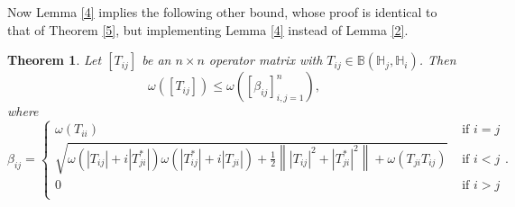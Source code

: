 \documentclass[12pt,twoside,reqno]{amsart}
\newtheorem{theorem}{Theorem}[section]
\numberwithin{equation}{section}
\begin{document}
Now Lemma \ref{4} implies the following other bound, whose proof is identical to that of Theorem \ref{5}, but implementing Lemma \ref{4} instead of Lemma \ref{2}.
\begin{theorem}\label{6}
Let $\left[ {{T}_{ij}} \right]$ be an $n\times n$ operator matrix with ${{T}_{ij}}\in \mathbb B\left( {{\mathbb H}_{j}},{{\mathbb H}_{i}} \right)$. Then
\[\omega \left( \left[ {{T}_{ij}} \right] \right)\le \omega \left( \left[ {{\beta }_{ij}} \right]_{i,j=1}^{n} \right),\]
where
\begin{equation*}
{{\beta }_{ij}}=\left\{ \begin{array}{ll}
   \omega \left( {{T}_{ii}} \right)&\text{ if }i=j \\ 
  \sqrt{\omega \left( \left| {{T}_{ij}} \right|+i\left| T_{ji}^{*} \right| \right)\omega \left( \left| T_{ij}^{*} \right|+i\left| {{T}_{ji}} \right| \right)+\frac{1}{2}\left\| {{\left| {{T}_{ij}} \right|}^{2}}+{{\left| T_{ji}^{*} \right|}^{2}} \right\|+\omega \left( {{T}_{ji}}{{T}_{ij}} \right)}&\text{ if }i<j \\ 
  0&\text{ if }i>j \\ 
\end{array} \right..
\end{equation*}
\end{theorem}
\end{document}
